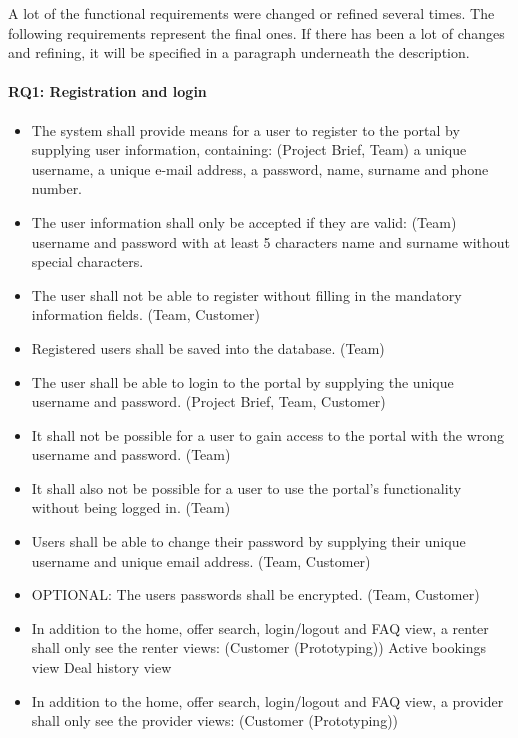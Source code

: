 A lot of the functional requirements were changed or refined several times.
The following requirements represent the final ones.
If there has been a lot of changes and refining, it will be specified in a paragraph underneath the description.

\paragraph{RQ1: Registration and login}
\begin{itemize}
    \item The system shall provide means for a user to register to the portal by supplying user information, containing:  (Project Brief, Team)
        \subitem a unique username,
        \subitem a unique e-mail address,
        \subitem a password,
        \subitem name, surname and phone number.
    \item The user information shall only be accepted if they are valid: (Team)
        \subitem username and password with at least 5 characters
        \subitem name and surname without special characters.
    \item The user shall not be able to register without filling in the mandatory information fields. (Team, Customer)
    \item Registered users shall be saved into the database. (Team)
    \item The user shall be able to login to the portal by supplying the unique username and password. (Project Brief, Team, Customer)
    \item It shall not be possible for a user to gain access to the portal with the wrong username and password. (Team)
    \item It shall also not be possible for a user to use the portal's functionality without being logged in. (Team)
    \item Users shall be able to change their password by supplying their unique username and unique email address. (Team, Customer)
    \item OPTIONAL: The users passwords shall be encrypted. (Team, Customer)
    \item In addition to the home, offer search, login/logout and FAQ view, a renter shall only see the renter views: (Customer (Prototyping))
        \subitem Active bookings view
        \subitem Deal history view
    \item In addition to the home, offer search, login/logout and FAQ view, a provider shall only see the provider views: (Customer (Prototyping))

\end{itemize}
